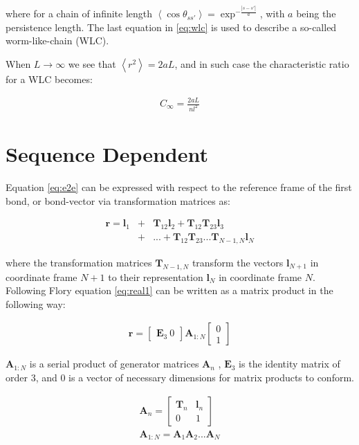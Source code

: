 where  for   a  chain  of  infinite   length  $\left<\cos{\theta_{ss'}}\right>  =
\exp^{-\frac{|s-s'|}{a}}$, with $a$ being the persistence length.  The
last   equation  in   \ref{eq:wlc}   is  used   to   describe  a   so-called
worm-like-chain (WLC).

When $L \to \infty$ we see that $\left<r^{2}\right>=2aL$, and in such
case the characteristic ratio for a WLC becomes:

\begin{gather}
C_{\infty}=\frac{2aL}{nl^{2}}  
\end{gather}  

\section{Sequence Dependent}
Equation \ref{eq:e2e} can be expressed with respect to the reference
frame of the first bond, or bond-vector via transformation matrices as:

\begin{eqnarray}
\label{eq:real1}  
\mathbf{r} = \mathbf{l}_{1} & + & \mathbf{T}_{12}\mathbf{l}_{2}
+\mathbf{T}_{12}\mathbf{T}_{23}\mathbf{l}_{3} \nonumber \\
 & + & ... + \mathbf{T}_{12}\mathbf{T}_{23}...\mathbf{T}_{N-1,N} \mathbf{l}_{N}
\end{eqnarray}

where the transformation matrices $\mathbf{T}_{N-1,N}$ transform the
vectors $\mathbf{l}_{N+1}$ in coordinate frame $N+1$ to their
representation $\mathbf{l}_{N}$ in coordinate frame $N$.
Following Flory \cite{flory1969} equation \ref{eq:real1} can be
written as a matrix product in the following way:

\begin{gather}
\mathbf{r}= \begin{bmatrix}\mathbf{E}_{3}~ 0 \end{bmatrix} \mathbf{A}_{1:N}\begin{bmatrix} 0 \\ 1 \end{bmatrix}
\end{gather}

$\mathbf{A}_{1:N}$ is a serial product of generator matrices
$\mathbf{A}_{n}$ \cite{flory1969, maroun1988a, marky1994a},
$\mathbf{E}_{3}$ is the identity matrix of order 3, and $0$ is a
vector of necessary dimensions for matrix products to conform.

\begin{gather}
\mathbf{A}_{n} =
\begin{bmatrix}
\mathbf{T}_{n} & \mathbf{l}_{n} \\
0 & 1
\end{bmatrix}\\
\mathbf{A}_{1:N}=\mathbf{A}_{1}\mathbf{A}_{2}...\mathbf{A}_{N}
\end{gather}

